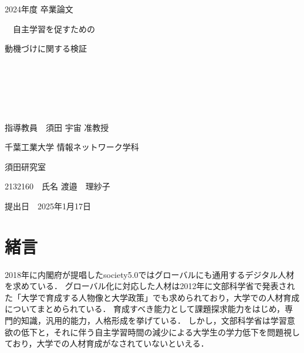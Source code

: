 \documentclass[12pt,a4j,titlepage]{ltjsarticle}
\begin{document}
\begin{titlepage}
  \begin{center}
  
    \vspace*{20truept}
    
    {\LARGE 2024年度 卒業論文} 
    
    \vspace*{75truept}
    
    {\Huge 　自主学習を促すための
    
    動機づけに関する検証}　%

    \vspace{10truept}

    {\Huge }　%

    \vspace{10truept}

    {\Huge }　%

    \vspace{85truept}
    
    {\LARGE 指導教員　須田 宇宙 准教授}
    
    \vspace{60truept}
    
    {\LARGE 千葉工業大学 情報ネットワーク学科}
    
    \vspace{15truept}
    
    {\LARGE 須田研究室}
    
    \vspace{70truept}
    
    {\LARGE 2132160　氏名 渡邉　理紗子 }　%

    \vspace{70truept}
    
  \end{center}
  \begin{flushright}

    {\LARGE 提出日　2025年1月17日}
  
  \end{flushright}
\end{titlepage}

\setcounter{tocdepth}{3}
\pagestyle{empty}
\tableofcontents
\listoftables
\listoffigures
\clearpage


\setcounter{page}{1}
\pagestyle{plain}
\section{緒言}
2018年に内閣府が提唱したsociety5.0ではグローバルにも通用するデジタル人材を求めている\cite{naikaku2022}．
グローバル化に対応した人材は2012年に文部科学省で発表された「大学で育成する人物像と大学政策」でも求められており，大学での人材育成についてまとめられている．
育成すべき能力として課題探求能力をはじめ，専門的知識，汎用的能力，人格形成を挙げている\cite{monka2012}．
しかし，文部科学省は学習意欲の低下と，それに伴う自主学習時間の減少による大学生の学力低下を問題視しており\cite{monka20122}，大学での人材育成がなされていないといえる．
\end{document}

